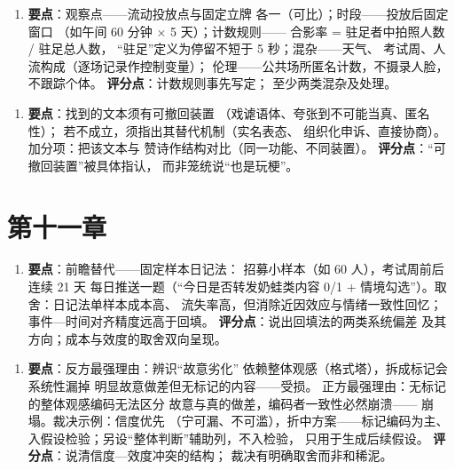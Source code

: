 \begin{enumerate}[label=\textbf{2.},leftmargin=2.6em]
  \item \textbf{要点}：观察点——流动投放点与固定立牌
        各一（可比）；时段——投放后固定窗口
        （如午间 60 分钟 $\times$ 5 天）；计数规则——
        合影率 = 驻足者中拍照人数 / 驻足总人数，
        “驻足”定义为停留不短于 5 秒；混杂——天气、
        考试周、人流构成（逐场记录作控制变量）；
        伦理——公共场所匿名计数，不摄录人脸，
        不跟踪个体。
        \textbf{评分点}：计数规则事先写定；
        至少两类混杂及处理。
\end{enumerate}

\begin{enumerate}[label=\textbf{3.},leftmargin=2.6em]
  \item \textbf{要点}：找到的文本须有可撤回装置
        （戏谑语体、夸张到不可能当真、匿名性）；
        若不成立，须指出其替代机制（实名表态、
        组织化申诉、直接协商）。加分项：把该文本与
        赞诗作结构对比（同一功能、不同装置）。
        \textbf{评分点}：“可撤回装置”被具体指认，
        而非笼统说“也是玩梗”。
\end{enumerate}

\section{第十一章}\label{app:ans:11}

\begin{enumerate}[label=\textbf{1.},leftmargin=2.6em]
  \item \textbf{要点}：前瞻替代——固定样本日记法：
        招募小样本（如 60 人），考试周前后连续 21 天
        每日推送一题（“今日是否转发奶蛙类内容 0/1 +
        情境勾选”）。取舍：日记法单样本成本高、
        流失率高，但消除近因效应与情绪一致性回忆；
        事件—时间对齐精度远高于回填。
        \textbf{评分点}：说出回填法的两类系统偏差
        及其方向；成本与效度的取舍双向呈现。
\end{enumerate}

\begin{enumerate}[label=\textbf{2.},leftmargin=2.6em]
  \item \textbf{要点}：反方最强理由：辨识“故意劣化”
        依赖整体观感（格式塔），拆成标记会系统性漏掉
        明显故意做差但无标记的内容——受损。
        正方最强理由：无标记的整体观感编码无法区分
        故意与真的做差，编码者一致性必然崩溃——
        崩塌。裁决示例：信度优先
        （宁可漏、不可滥），折中方案——标记编码为主、
        入假设检验；另设“整体判断”辅助列，不入检验，
        只用于生成后续假设。
        \textbf{评分点}：说清信度—效度冲突的结构；
        裁决有明确取舍而非和稀泥。
\end{enumerate}

